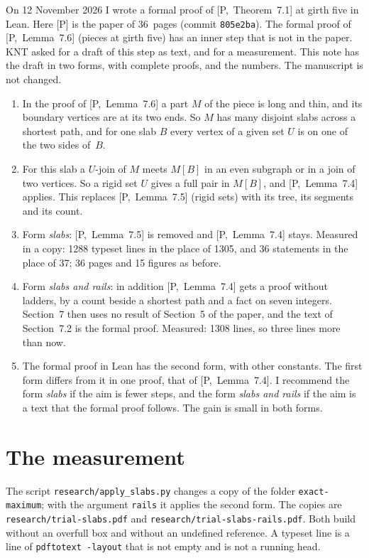 \documentclass[11pt]{article}
\newcommand{\inP}[1]{[P,~#1]}
\begin{document}
\maketitleblock

On 12 November 2026 I wrote a formal proof of \inP{Theorem~7.1} at girth five in Lean. Here [P]
is the paper of 36~pages (commit \texttt{805e2ba}). The formal proof of \inP{Lemma~7.6} (pieces at
girth five) has an inner step that is not in the paper. KNT asked for a draft of this step as
text, and for a measurement. This note has the draft in two forms, with complete proofs, and the
numbers. The manuscript is not changed.

\begin{enumerate}[leftmargin=1.6em]
\item In the proof of \inP{Lemma~7.6} a part $M$ of the piece is long and thin, and its boundary
vertices are at its two ends. So $M$ has many disjoint slabs across a shortest path, and for one
slab $B$ every vertex of a given set $U$ is on one of the two sides of~$B$.
\item For this slab a $U$-join of $M$ meets $M[B]$ in an even subgraph or in a join of two
vertices. So a rigid set $U$ gives a full pair in $M[B]$, and \inP{Lemma~7.4} applies. This
replaces \inP{Lemma~7.5} (rigid sets) with its tree, its segments and its count.
\item Form \emph{slabs}: \inP{Lemma~7.5} is removed and \inP{Lemma~7.4} stays. Measured in a copy:
1288 typeset lines in the place of 1305, and 36 statements in the place of 37; 36 pages and 15
figures as before.
\item Form \emph{slabs and rails}: in addition \inP{Lemma~7.4} gets a proof without ladders, by a
count beside a shortest path and a fact on seven integers. Section~7 then uses no result of
Section~5 of the paper, and the text of Section~7.2 is the formal proof. Measured: 1308 lines,
so three lines more than now.
\item The formal proof in Lean has the second form, with other constants. The first form
differs from it in one proof, that of \inP{Lemma~7.4}. I recommend the form \emph{slabs} if the
aim is fewer steps, and the form \emph{slabs and rails} if the aim is a text that the formal
proof follows. The gain is small in both forms.
\end{enumerate}

\section{The measurement}

The script \texttt{research/apply\_slabs.py} changes a copy of the folder
\texttt{exact-maximum}; with the argument \texttt{rails} it applies the second form. The copies
are \texttt{research/trial-slabs.pdf} and \texttt{research/trial-slabs-rails.pdf}. Both build
without an overfull box and without an undefined reference. A typeset line is a line of
\texttt{pdftotext -layout} that is not empty and is not a running head.
\end{document}
